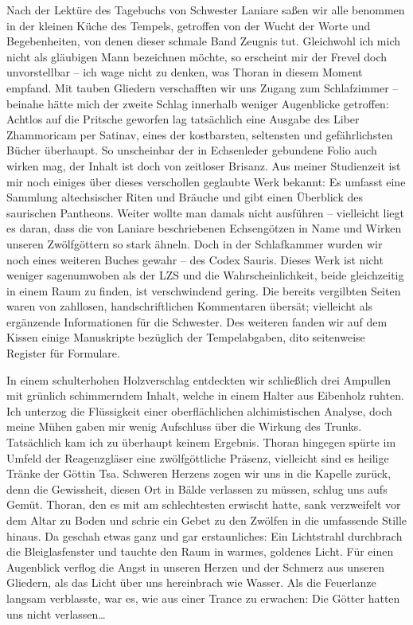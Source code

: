 \documentclass[11pt]{scrreprt}
\begin{document}
Nach der Lektüre des Tagebuchs von Schwester Laniare saßen wir alle benommen in der kleinen Küche des Tempels, getroffen von der Wucht der Worte und Begebenheiten, von denen dieser schmale Band Zeugnis tut. Gleichwohl ich mich nicht als gläubigen Mann bezeichnen möchte, so erscheint mir der Frevel doch unvorstellbar – ich wage nicht zu denken, was Thoran in diesem Moment empfand. Mit tauben Gliedern verschafften wir uns Zugang zum Schlafzimmer – beinahe hätte mich der zweite Schlag innerhalb weniger Augenblicke getroffen: Achtlos auf die Pritsche geworfen lag tatsächlich eine Ausgabe des Liber Zhammoricam per Satinav, eines der kostbarsten, seltensten und gefährlichsten Bücher überhaupt. So unscheinbar der in Echsenleder gebundene Folio auch wirken mag, der Inhalt ist doch von zeitloser Brisanz. Aus meiner Studienzeit ist mir noch einiges über dieses verschollen geglaubte Werk bekannt: Es umfasst eine Sammlung altechsischer Riten und Bräuche und gibt einen Überblick des saurischen Pantheons. Weiter wollte man damals nicht ausführen – vielleicht liegt es daran, dass die von Laniare beschriebenen Echsengötzen in Name und Wirken unseren Zwölfgöttern so stark ähneln. Doch in der Schlafkammer wurden wir noch eines weiteren Buches gewahr – des Codex Sauris. Dieses Werk ist nicht weniger sagenumwoben als der LZS und die Wahrscheinlichkeit, beide gleichzeitig in einem Raum zu finden, ist verschwindend gering. Die bereits vergilbten Seiten waren von zahllosen, handschriftlichen Kommentaren übersät; vielleicht als ergänzende Informationen für die Schwester. Des weiteren fanden wir auf dem Kissen einige Manuskripte bezüglich der Tempelabgaben, dito seitenweise Register für Formulare.\par

In einem schulterhohen Holzverschlag entdeckten wir schließlich drei Ampullen mit grünlich schimmerndem Inhalt, welche in einem Halter aus Eibenholz ruhten. Ich unterzog die Flüssigkeit einer oberflächlichen alchimistischen Analyse, doch meine Mühen gaben mir wenig Aufschluss über die Wirkung des Trunks. Tatsächlich kam ich zu überhaupt keinem Ergebnis. Thoran hingegen spürte im Umfeld der Reagenzgläser eine zwölfgöttliche Präsenz, vielleicht sind es heilige Tränke der Göttin Tsa. Schweren Herzens zogen wir uns in die Kapelle zurück, denn die Gewissheit, diesen Ort in Bälde verlassen zu müssen, schlug uns aufs Gemüt. Thoran, den es mit am schlechtesten erwischt hatte, sank verzweifelt vor dem Altar zu Boden und schrie ein Gebet zu den Zwölfen in die umfassende Stille hinaus. Da geschah etwas ganz und gar erstaunliches: Ein Lichtstrahl durchbrach die Bleiglasfenster und tauchte den Raum in warmes, goldenes Licht. Für einen Augenblick verflog die Angst in unseren Herzen und der Schmerz aus unseren Gliedern, als das Licht über uns hereinbrach wie Wasser. Als die Feuerlanze langsam verblasste, war es, wie aus einer Trance zu erwachen: Die Götter hatten uns nicht verlassen…
\end{document}
